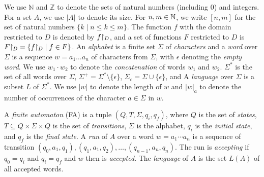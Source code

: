 \documentclass[sigplan,review,anonymous]{acmart}\settopmatter{printfolios=true,printccs=false,printacmref=false}
\begin{document}
We use $\mathbb{N}$ and $\mathbb{Z}$ to denote the sets of natural numbers (including 0) and 
integers. For a set $A$, we use $|A|$ to denote its size. 
For $n,m\in\mathbb{N}$, we write $[n,m]$ for the set of natural numbers 
$\{k\mid n\leq k \leq m\}$. 
The function $f$ with the domain restricted to $D$ is denoted by $f{\restriction_{D}}$,
and a set of functions $F$ restricted to $D$ is $F{\restriction_{D}} = \{f{\restriction_{D}} \mid f \in F\}$.
An \emph{alphabet} is a finite set $\Sigma$ of \emph{characters} and a \emph{word} over $\Sigma$ is a sequence $w = a_1\ldots a_n$ of characters from $\Sigma$, with $\epsilon$ denoting the \emph{empty word}. 
We use $w_1\cdot w_2$ to denote the \emph{concatenation} of words $w_1$ and $w_2$.
$\Sigma^*$ is the set of all words over $\Sigma$, $\Sigma^+ = \Sigma^*\setminus \{\epsilon\}$, $\Sigma_\epsilon = \Sigma\cup\{\epsilon\}$, and 
A \emph{language} over $\Sigma$ is a subset $L$ of $\Sigma^*$. 
%
We use $|w|$ to denote the length of $w$ and $|w|_a$ to denote the number of occurrences of the character $a\in \Sigma$ in $w$. 

A \emph{finite automaton} (FA) is a tuple $(Q,T,\Sigma,q_i,q_f)$, where $Q$ is the set of \emph{states}, $T\subseteq Q\times \Sigma \times Q $ is the set of \emph{transitions}, $\Sigma$ is the alphabet, $q_i$ is the \emph{initial state}, and $q_f$ is the \emph{final state}. 
A \emph{run} of $A$ over a word $w = a_1\cdots a_n$ is a sequence of transition $(q_0,a_1,q_1),(q_1,a_1,q_2),\ldots,(q_{n-1},a_n,q_n)$. The run is \emph{accepting} if $q_0 = q_i$ and $q_i = q_f$ and $w$ then is \emph{accepted}.
The \emph{language} of $A$ is the set $L(A)$ of all accepted words.

%
\end{document}

